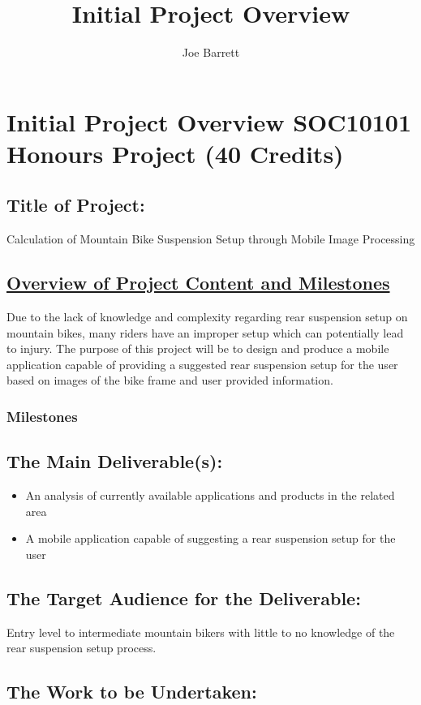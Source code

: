 \documentclass[a4paper, 12pt]{article}
\title{Initial Project Overview}
\author{Joe Barrett}
\begin{document}
	\setcounter{secnumdepth}{-1}
	\section[Heading]{\Large Initial Project Overview
			\newline
			SOC10101 Honours Project (40 Credits)
	}
	
	\subsection[Title]{Title of Project:}
	Calculation of Mountain Bike Suspension Setup through Mobile Image Processing
	
	\subsection[Overview]{\underline{Overview of Project Content and Milestones}}
	Due to the lack of knowledge and complexity regarding rear suspension setup on mountain bikes, many riders have an improper setup which can potentially lead to injury. The purpose of this project will be to design and produce a mobile application capable of providing a suggested rear suspension setup for the user based on images of the bike frame and user provided information. 
	\subsubsection{Milestones}
	
	
	\subsection[Deliverables]{The Main Deliverable(s):}
	\begin{itemize}
		\item An analysis of currently available applications and products in the related area
		\item A mobile application capable of suggesting a rear suspension setup for the user
	\end{itemize}
	
	\subsection[Audience]{The Target Audience for the Deliverable:}
	Entry level to intermediate mountain bikers with little to no knowledge of the rear suspension setup process.
	
	\subsection[Work]{The Work to be Undertaken:}
	
\end{document}
